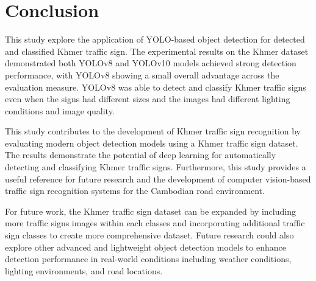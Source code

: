 \section{Conclusion}
This study explore the application of YOLO-based object detection for detected and classified Khmer traffic sign.
The experimental results on the Khmer dataset demonstrated both YOLOv8 and YOLOv10 models achieved strong detection
performance, with YOLOv8 showing a small overall advantage across the evaluation measure. YOLOv8 was able to detect
and classify Khmer traffic signs even when the signs had different sizes and the images had different lighting conditions
and image quality.

This study contributes to the development of Khmer traffic sign recognition by evaluating modern object detection models
using a Khmer traffic sign dataset. The results demonstrate the potential of deep learning for automatically detecting and
classifying Khmer traffic signs. Furthermore, this study provides a useful reference for future research and the development
of computer vision-based traffic sign recognition systems for the Cambodian road environment.

For future work, the Khmer traffic sign dataset can be expanded by including more traffic signs images within each classes 
and incorporating additional traffic sign classes to create more comprehensive dataset. Future research could also explore other advanced and lightweight
object detection models to enhance detection performance in real-world conditions including weather conditions, lighting environments,
and road locations. 